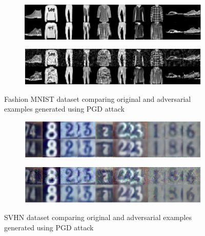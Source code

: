 \documentclass[journal]{IEEEtran}
\begin{document}
\begin{figure}[t]
	\centering

	\begin{subfigure}{\textwidth}
		\centering
		\includegraphics[width=\textwidth]{Images/MNIST/PGD/Original.png}
	\end{subfigure}
	\begin{subfigure}{\textwidth}
		\centering
		\includegraphics[width=\textwidth]{Images/MNIST/PGD/PGD.png}
	\end{subfigure}

	\caption{Fashion MNIST dataset comparing original and adversarial examples generated using PGD\cite{PGD} attack}

	\label{fig:FMNISTPGD}
\end{figure}

\begin{figure}[t]
	\centering

	\begin{subfigure}{\textwidth}
		\centering
		\includegraphics[width=\textwidth]{Images/SVHN/Original.png}
	\end{subfigure}
	\begin{subfigure}{\textwidth}
		\centering
		\includegraphics[width=\textwidth]{Images/SVHN/PGD.png}
	\end{subfigure}

	\caption{SVHN dataset comparing original and adversarial examples generated using PGD\cite{PGD} attack}
	
	\label{fig:SVHNPGD}
\end{figure}
\end{document}
